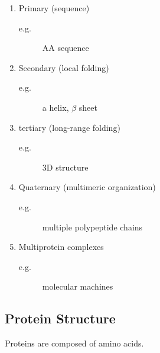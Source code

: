 \documentclass[11pt]{scrartcl}
\begin{document}
\begin{enumerate}
\item\label{item:29} Primary (sequence)
  \begin{description}

  \item[e.g.] AA sequence

  \end{description}


\item\label{item:30} Secondary (local folding)

  \begin{description}

  \item[e.g.] a helix, $\beta$ sheet

  \end{description}


\item\label{item:31} tertiary (long-range folding)

  \begin{description}

  \item[e.g.] 3D structure

  \end{description}


\item\label{item:32} Quaternary (multimeric organization)

  \begin{description}

  \item[e.g.] multiple polypeptide chains

  \end{description}


\item\label{item:33} Multiprotein complexes

  \begin{description}

  \item[e.g.] molecular machines

  \end{description}
\end{enumerate}

\subsection{Protein Structure}

Proteins are composed of amino acids.
\end{document}
